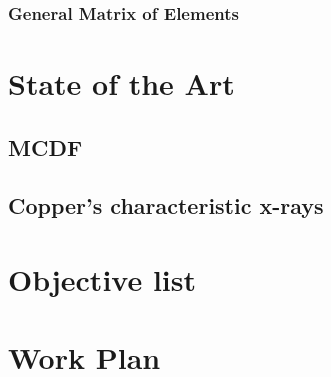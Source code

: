 \subsubsection{General Matrix of Elements}



\section{State of the Art}

\subsection{MCDF}

\subsection{Copper's characteristic x-rays}

\section{Objective list}

\section{Work Plan}
